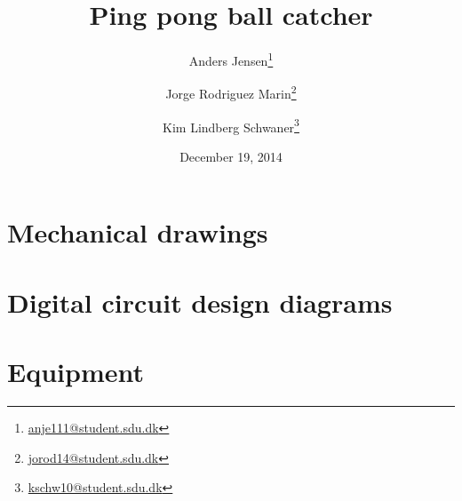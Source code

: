 \documentclass[]{report}
\title{Ping pong ball catcher}
\date{December 19, 2014}
\author{Anders Jensen\thanks{\url{anje111@student.sdu.dk}}}
\author{Jorge Rodriguez Marin\thanks{\url{jorod14@student.sdu.dk}}}
\author{Kim Lindberg Schwaner\thanks{\url{kschw10@student.sdu.dk}}}
\affil{University of Southern Denmark\\Faculty of Engineering\\EMB1}
\begin{document}
	\maketitle
	
	\tableofcontents
	
	
	
	
	
	
	
	
	

	\printbibliography[heading=bibintoc]

	\appendix
		\chapter{Mechanical drawings}
		\label{chap:mechanical_drawings}
			

		\chapter{Digital circuit design diagrams}
		\label{chap:digi_diagrams}
			
			

		\chapter{Equipment}
		\label{cha:equipment}
			
\end{document}
